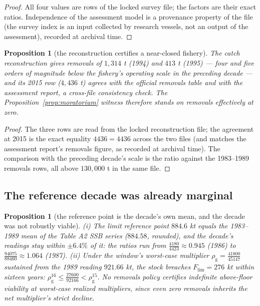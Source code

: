 \documentclass[10pt,twocolumn]{article}
\theoremstyle{plain}
\newtheorem{proposition}[theorem]{Proposition}
\theoremstyle{remark}
\begin{document}
\begin{proof}
All four values are rows of the locked survey file; the factors are
their exact ratios. Independence of the assessment model is a
provenance property of the file (the survey index is an input collected
by research vessels, not an output of the assessment), recorded at
archival time.
\end{proof}

\begin{proposition}[the reconstruction certifies a near-closed
fishery]\label{prop:catchrecord}
The catch reconstruction gives removals of \(1{,}314\) t (1994) and
\(413\) t (1995) --- four and five orders of magnitude below the
fishery's operating scale in the preceding decade --- and its 2015 row
(\(4{,}436\) t) agrees with the official removals table and with the
assessment report, a cross-file consistency check. The
Proposition~\ref{prop:moratorium} witness therefore stands on removals
effectively at zero.
\end{proposition}

\begin{proof}
The three rows are read from the locked reconstruction file; the
agreement at 2015 is the exact equality \(4436 = 4436\) across the two
files (and matches the assessment report's removals figure, as recorded
at archival time). The comparison with the preceding decade's scale is
the ratio against the 1983--1989 removals rows, all above
\(130{,}000\) t in the same file.
\end{proof}

\subsection{The reference decade was already marginal}\label{marginal}

\begin{proposition}[the reference point is the decade's own mean, and
the decade was not robustly viable]\label{prop:marginal}
(i) The limit reference point \(884.6\) kt equals the 1983--1989 mean
of the Table A2 SSB series (\(884.58\), rounded), and the decade's
readings stay within \(\pm 6.4\%\) of it: the ratios run from
\(\tfrac{4180}{4423} \approx 0.945\) (1986) to
\(\tfrac{94075}{88460} \approx 1.064\) (1987). (ii) Under the window's
worst-case multiplier \(\rho_{\mathrm{g}} = \tfrac{41800}{45147}\)
sustained from the 1989 reading \(921.66\) kt, the stock breaches
\(F_{\mathrm{lim}} = 276\) kt within sixteen years:
\(\rho_{\mathrm{g}}^{16} \le \tfrac{27600}{92166} < \rho_{\mathrm{g}}^{15}\).
No removals policy certifies indefinite above-floor viability at
worst-case realized multipliers, since even zero removals inherits the
net multiplier's strict decline.
\end{proposition}
\end{document}

